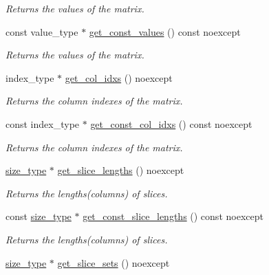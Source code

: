\begin{DoxyCompactItemize}
\begin{DoxyCompactList}\small\item\em Returns the values of the matrix. \end{DoxyCompactList}\item 
const value\+\_\+type $\ast$ \hyperlink{classgko_1_1matrix_1_1Sellp_a8a3c4738049b7e6819806bb51e1a5523}{get\+\_\+const\+\_\+values} () const noexcept
\begin{DoxyCompactList}\small\item\em Returns the values of the matrix. \end{DoxyCompactList}\item 
index\+\_\+type $\ast$ \hyperlink{classgko_1_1matrix_1_1Sellp_abb770ef6fed094f707c96219a8b69d11}{get\+\_\+col\+\_\+idxs} () noexcept
\begin{DoxyCompactList}\small\item\em Returns the column indexes of the matrix. \end{DoxyCompactList}\item 
const index\+\_\+type $\ast$ \hyperlink{classgko_1_1matrix_1_1Sellp_a6b5417bd6f2c876925ce732c7526b562}{get\+\_\+const\+\_\+col\+\_\+idxs} () const noexcept
\begin{DoxyCompactList}\small\item\em Returns the column indexes of the matrix. \end{DoxyCompactList}\item 
\hyperlink{namespacegko_a6e5c95df0ae4e47aab2f604a22d98ee7}{size\+\_\+type} $\ast$ \hyperlink{classgko_1_1matrix_1_1Sellp_ab22f4de41d95db19e96433dc4583f512}{get\+\_\+slice\+\_\+lengths} () noexcept
\begin{DoxyCompactList}\small\item\em Returns the lengths(columns) of slices. \end{DoxyCompactList}\item 
const \hyperlink{namespacegko_a6e5c95df0ae4e47aab2f604a22d98ee7}{size\+\_\+type} $\ast$ \hyperlink{classgko_1_1matrix_1_1Sellp_adf13bb4a4f8660b4ae27fe2ae6a874aa}{get\+\_\+const\+\_\+slice\+\_\+lengths} () const noexcept
\begin{DoxyCompactList}\small\item\em Returns the lengths(columns) of slices. \end{DoxyCompactList}\item 
\hyperlink{namespacegko_a6e5c95df0ae4e47aab2f604a22d98ee7}{size\+\_\+type} $\ast$ \hyperlink{classgko_1_1matrix_1_1Sellp_afecef07cef594f1d23c735e66ee90ec6}{get\+\_\+slice\+\_\+sets} () noexcept

\end{DoxyCompactItemize}

